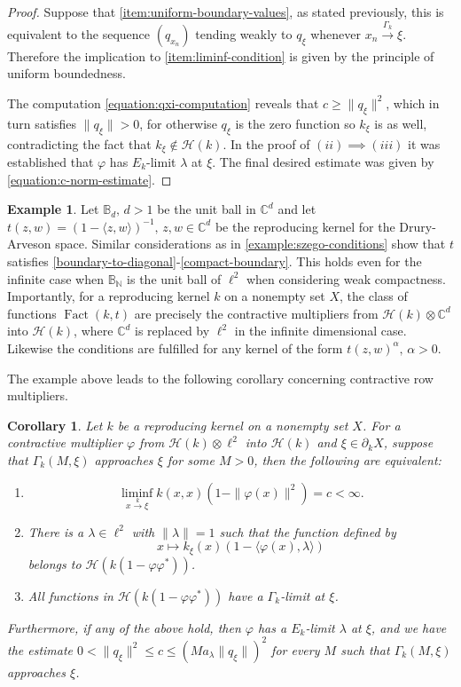 \documentclass[leqno, final]{article}
\newtheorem{corollary}{Corollary}
\theoremstyle{definition}
\newtheorem{example}{Example}
\newcommand{\xto}[1]{\stackrel{#1}{\to}}
\newcommand{\ball}{\mathbb{B}}
\newcommand{\plane}{\mathbb{C}}
\renewcommand{\natural}{\mathbb{N}}
\newcommand{\Hilbert}{\mathcal{H}}
\newcommand{\rand}{\partial}
\renewcommand{\phi}{\varphi}
\newcommand{\la}{\langle}
\newcommand{\ra}{\rangle}
\DeclareMathOperator{\Fact}{Fact}
\begin{document}
\begin{proof}
Suppose that \ref{item:uniform-boundary-values}, as stated previously,
this is equivalent to the sequence $(q_{x_n})$ tending weakly to $q_\xi$
whenever $x_n\xto{\Gamma_k}\xi$. Therefore the implication to \ref{item:liminf-condition}
is given by the principle of uniform boundedness.

The computation \eqref{equation:qxi-computation} reveals that $c\geq\|q_\xi\|^2$, which in
turn satisfies $\|q_\xi\|>0$, for otherwise $q_\xi$ is the zero function so $k_\xi$ is
as well, contradicting the fact that $k_\xi\notin\Hilbert(k)$.
In the proof of $(ii)\implies(iii)$ it was established that $\phi$ has $E_k$-limit
$\lambda$ at $\xi$.
The final desired estimate was given by \eqref{equation:c-norm-estimate}.
\end{proof}

\begin{example}
Let $\ball_d,\,d>1$ be the unit ball in $\plane^d$ and let
$t(z,w) = (1-\la z,w\ra)^{-1},\,z,w\in\plane^d$ be the reproducing kernel
for the Drury-Arveson space. Similar considerations as in \cref{example:szego-conditions}
show that $t$ satisfies \ref{boundary-to-diagonal}-\ref{compact-boundary}. This
holds even for the infinite case when $\ball_\natural$ is the unit ball of $\ell^2$ when considering
weak compactness. Importantly, for a reproducing kernel $k$ on a nonempty set $X$,
the class of functions $\Fact(k,t)$ are precisely the contractive multipliers from
$\Hilbert(k)\otimes\plane^d$ into $\Hilbert(k)$, where $\plane^d$ is replaced by $\ell^2$ in
the infinite dimensional case.
\\ Likewise the conditions are fulfilled for any kernel of the form $t(z,w)^\alpha,\,\alpha>0$.
\end{example}

The example above leads to the following corollary concerning contractive row multipliers.
\begin{corollary}\label{corollary:row-contractive-multiplier}
Let $k$ be a reproducing kernel on a nonempty set $X$. For a contractive multiplier $\phi$
from $\Hilbert(k)\otimes\ell^2$ into $\Hilbert(k)$ and $\xi\in\rand_kX$, suppose that
$\Gamma_k(M,\xi)$ approaches $\xi$ for some $M>0$, then the following are equivalent:
\begin{enumerate}[label=(\roman*)]
\item \[
	\liminf_{x\xto{k}\xi}k(x,x)(1-\|\phi(x)\|^2) = c < \infty.
\]
\item There is a $\lambda\in\ell^2$ with $\|\lambda\|=1$ such that the function defined by \[
	x\mapsto k_\xi(x)(1-\la\phi(x),\lambda\ra)
\]
belongs to $\Hilbert(k(1-\phi\phi^*))$.
\item All functions in $\Hilbert(k(1-\phi\phi^*))$ have a $\Gamma_k$-limit at $\xi$.
\end{enumerate}
Furthermore, if any of the above hold, then $\phi$ has a $E_k$-limit $\lambda$ at $\xi$,
and we have the estimate $0<\|q_\xi\|^2\leq c\leq (Ma_\lambda\|q_\xi\|)^2$ for
every $M$ such that $\Gamma_k(M,\xi)$ approaches $\xi$.
\end{corollary}
\end{document}
